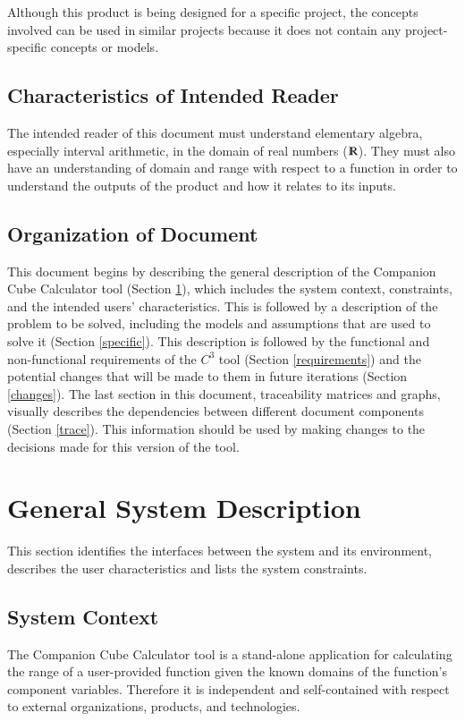 \documentclass[12pt]{article}
\newcommand{\progname}{Companion Cube Calculator} %
\newcommand{\prognameAbbrv}{$C^{3}$}
\begin{document}
Although this product is being designed for a specific project, the concepts 
involved can be used in similar projects because it does not contain any 
project-specific concepts or models.

\subsection{Characteristics of Intended Reader}
\label{intro_reader}
The intended reader of this document must understand elementary algebra, 
especially interval arithmetic, in the domain of real numbers 
($\varmathbb{R}$). They must also have an understanding of domain and range 
with respect to a function in order to understand the outputs of the product 
and how it relates to its 
inputs.

\subsection{Organization of Document}
This document begins by describing the general description of the \progname{} 
tool (Section \ref{general}), which includes the system context, constraints, 
and the intended users' characteristics. This is followed by a description of 
the problem to be solved, including the models and assumptions that are used to 
solve it (Section \ref{specific}). This description is followed by the 
functional and non-functional requirements of the \prognameAbbrv{} tool 
(Section \ref{requirements}) and the potential changes that will be made to 
them in future iterations (Section \ref{changes}). The last section in this 
document, traceability matrices and graphs, visually describes the dependencies 
between different document components (Section \ref{trace}). This information 
should be used by making changes to the decisions made for this version of the 
tool.

\section{General System Description}
\label{general}

This section identifies the interfaces between the system and its environment,
describes the user characteristics and lists the system constraints.

\subsection{System Context}
The \progname{} tool is a stand-alone application for calculating the range of 
a user-provided function given the known domains of the function's component 
variables. Therefore it is independent and self-contained with respect to 
external organizations, products, and technologies.
\end{document}
